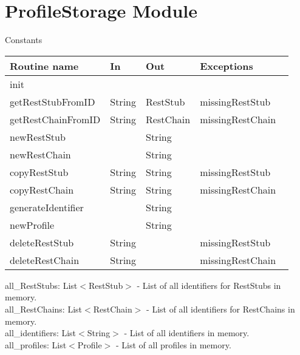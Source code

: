 \documentclass[12pt, titlepage]{article}
\newcommand{\newModule}[9]{
	\subsection* {Module}
		#1
	\subsection* {Uses}
		#2
	\subsection* {Syntax}
		\subsubsection* {Exported Types}
			#3
		\subsubsection* {Exported Access Programs}
			#4
	\subsection* {Semantics}
		\subsubsection* {State Variables}
			#5
		\subsubsection* {State Invariant}
			#6
		\subsubsection* {Assumptions}
			#7
		\subsubsection* {Access Routine Semantics}
			#8
		\subsubsection* {Local Functions}
			#9
}
\newcommand{\row}[4]{#1 & #2 & #3 & #4 ~\\ \hline}
\newcommand{\accessProgramsTableStart}{
\begin{tabular}{| l | l | l | l |}
\hline
\textbf{Routine name} & \textbf{In} & \textbf{Out} & \textbf{Exceptions}\\
\hline
}
\newcommand{\accessProgramsTableEnd}{
	\end{tabular}
}
\begin{document}
\newpage

\section {ProfileStorage Module}

\label{ProfileStorage}

	{%
		Constants
	}
	{%
		
	}
	{%
		\accessProgramsTableStart
			\row{init}{}{}{}
			\row{getRestStubFromID}{String}{RestStub}{missingRestStub}
            \row{getRestChainFromID}{String}{RestChain}{missingRestChain}
            \row{newRestStub}{}{String}{}
            \row{newRestChain}{}{String}{}
            \row{copyRestStub}{String}{String}{missingRestStub}
            \row{copyRestChain}{String}{String}{missingRestChain}
            \row{generateIdentifier}{}{String}{}
            \row{newProfile}{}{String}{}
            \row{deleteRestStub}{String}{}{missingRestStub}
            \row{deleteRestChain}{String}{}{missingRestChain}
		\accessProgramsTableEnd
	}
	{%
		all\_RestStubs: List$<$RestStub$>$ - List of all identifiers for RestStubs in memory. \\
        all\_RestChains: List$<$RestChain$>$ - List of all identifiers for RestChains in memory. \\
        all\_identifiers: List$<$String$>$ - List of all identifiers in memory. \\
        all\_profiles: List$<$Profile$>$ - List of all profiles in memory. \\
	}
\end{document}
